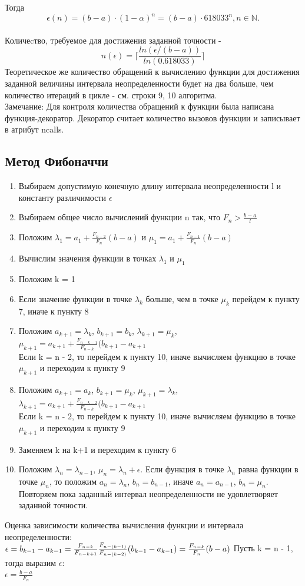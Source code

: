\documentclass[main.tex]{subfiles}
\begin{document}
	Тогда $$\epsilon(n) = (b - a)\cdot(1 - \alpha)^n = (b - a)\cdot 618033^n, n \in \mathbb{N}.$$\\
	Количеcтво, требуемое для достижения заданной точности - $$n(\epsilon) = \bigg\lceil\frac{ln(\epsilon/(b-a))}{ln(0.618033)}\bigg\rceil$$
	Теоретическое же количество обращений к вычислению функции для достижения заданной величины интервала неопределенности будет на два больше, чем количество итераций в цикле - см. строки 9, 10 алгоритма.\\
	Замечание: Для контроля количества обращений к функции была написана функция-декоратор. Декоратор считает количество вызовов функции и записывает в атрибут ncalls.
	
	
	
	
	\subsection{Метод Фибоначчи}
	\begin{enumerate}
		\item Выбираем допустимую конечную длину интервала неопределенности l и константу различимости $\epsilon$ 
		\item Выбираем общее число вычислений функции n так, что $F_n >\frac{b-a}{l}$
		\item Положим $\lambda_1 = a_1+\frac{F_{n-2}}{F_n}(b-a)$ и  $\mu_1 = a_1+\frac{F_{n-1}}{F_n}(b-a)$
		\item Вычислим значения функции в точках $\lambda_1$ и $\mu_1$
		\item Положим k = 1
		\item Если значение функции в точке $\lambda_k$ больше, чем в точке $\mu_k$ перейдем к пункту 7, иначе к пункту 8
		\item Положим $a_{k+1} = \lambda_k$, $b_{k+1} = b_k$, $\lambda_{k+1} = \mu_k$, $\mu_{k+1} = a_{k+1}+\frac{F_{n-k-1}}{F_{n-k}}(b_{k+1}-a_{k+1}$\\
		Если k = n - 2, то перейдем к пункту 10, иначе вычисляем функцию в точке $\mu_{k+1}$ и переходим к пункту 9
		\item Положим $a_{k+1} = a_k$, $b_{k+1} = \mu_k$, $\mu_{k+1} = \lambda_k$, $\lambda_{k+1} = a_{k+1}+\frac{F_{n-k-2}}{F_{n-k}}(b_{k+1}-a_{k+1}$\\
		Если k = n - 2, то перейдем к пункту 10, иначе вычисляем функцию в точке $\mu_{k+1}$ и переходим к пункту 9
		\item Заменяем k на k+1 и переходим к пункту 6
		\item Положим $\lambda_{n} = \lambda_{n-1}$, $\mu_{n} = \lambda_n + \epsilon$. Если функция в точке $\lambda_n$ равна функции в точке $\mu_n$, то положим $a_n = \lambda_n$, $b_n=b_{n-1}$, иначе $a_n = a_{n-1}$, $b_n=\mu_n$. Повторяем пока заданный интервал неопределенности не удовлетворяет заданной точности.
	\end{enumerate}
	Оценка зависимости количества вычисления функции и интервала неопределенности:\\
	$\epsilon = b_{k-1}-a_{k-1} = \frac{F_{n-k}}{F_{n-k+1}}\frac{F_{n-(k-1)}}{F_{n-(k-2)}}(b_{k-1}-a_{k-1}) = \frac{F_{n-k}}{F_n} (b-a)\\$
	Пусть k = n - 1, тогда выразим $\epsilon$:\\
	$\epsilon = \frac{b-a}{F_n}$
	
\end{document}
